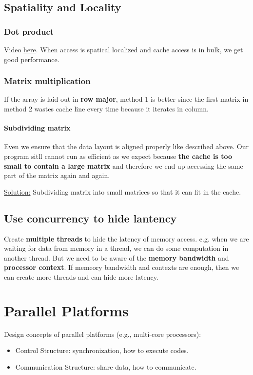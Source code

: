\documentclass{../../ainote}
\begin{document}

\subsection{Spatiality and Locality}
\subsubsection{Dot product}
Video \href{https://www.youtube.com/watch?v=rIwEPyWAsDo}{here}.
When access is spatical localized and cache access is in bulk, we get good performance.
\subsubsection{Matrix multiplication}
If the array is laid out in \textbf{row major}, method 1 is better since the first matrix in method 2 wastes cache line every time because it iterates in column.

\paragraph{Subdividing matrix}\mbox\\
Even we ensure that the data layout is aligned properly like described above. Our program sitll cannot run as efficient as we expect because \textbf{the cache is too small to contain a large matrix} and therefore we end up accessing the same part of the matrix again and again.

\underline{Solution:} Subdividing matrix into small matrices so that it can fit in the cache.

\subsection{Use concurrency to hide lantency}
Create \textbf{multiple threads} to hide the latency of memory access. e.g. when we are waiting for data from memory in a thread, we can do some computation in another thread. But we need to be aware of the \textbf{memory bandwidth} and \textbf{processor context}. If memeory bandwidth and contexts are enough, then we can create more threads and can hide more latency.

\section{Parallel Platforms}
Design concepts of parallel platforms (e.g., multi-core processors):
\begin{itemize}
    \item Control Structure: synchronization, how to execute codes.
    \item Communication Structure: share data, how to communicate.
\end{itemize}
\end{document}

